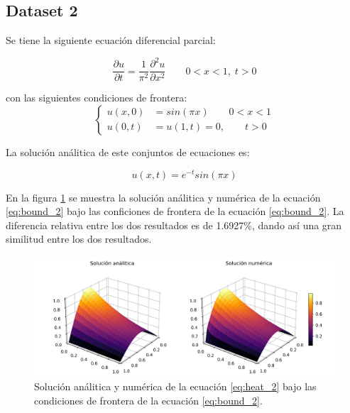 \subsection{Dataset 2}

Se tiene la siguiente ecuación diferencial parcial:

\begin{equation}
    \frac{\partial u}{\partial t} = \frac{1}{\pi^2}\frac{\partial^2 u}{\partial x^2} \qquad 0<x<1, \; t>0 \label{eq:heat_2}
\end{equation}

con las siguientes condiciones de frontera:
\begin{equation}
    \begin{cases}
        u(x,0) & = sin(\pi x) \qquad 0<x<1 \\
        u(0,t) & =u(1,t) = 0, \qquad t>0
    \end{cases} \label{eq:bound_2}
\end{equation}

La solución análitica de este conjuntos de ecuaciones es:

\begin{equation}
    u(x,t)= e^{-t}sin(\pi x) \label{eq:sol_2}
\end{equation}

En la figura \ref{fig:sol_2} se muestra la solución análitica y numérica de la ecuación \ref{eq:bound_2} bajo las conficiones de frontera de la ecuación \ref{eq:bound_2}. La diferencia relativa entre los dos resultados es de 1.6927\%, dando así una gran similitud entre los dos resultados.

\begin{figure}[H]
    \centering
    \includegraphics[width=17cm]{Graphics/surface_2.png}
    \caption{Solución análitica y numérica de la ecuación \ref{eq:heat_2} bajo las condiciones de frontera de la ecuación \ref{eq:bound_2}.}
    \label{fig:sol_2}
\end{figure}

